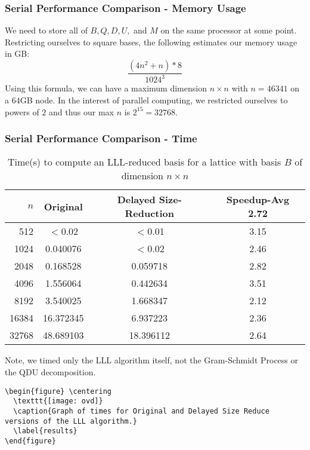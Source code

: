 \documentclass{beamer}
\begin{document}
\begin{frame}
\frametitle{Serial Performance Comparison - Memory Usage}
We need to store all of $B,Q,D,U,$ and $M$ on the same processor at some point. Restricting ourselves to square bases, the following estimates our memory usage in GB:
$$\frac{(4n^2+n)*8}{1024^3}$$
Using this formula, we can have a maximum dimension $n \times n$ with $n=46341$ on a $64$GB node. In the interest of parallel computing, we restricted ourselves to powers of $2$ and thus our max $n$ is $2^{15}=32768$.
\end{frame}
\begin{frame}
\frametitle{Serial Performance Comparison - Time}
\begin{table} \centering
  \caption{Time(s) to compute an LLL-reduced basis for a lattice with basis $B$ of dimension $n\times n$}
  \label{tab:convdemo}
  \vspace{-0.5\baselineskip}
  \begin{tabular}{rccc}
    \hline
    $n$ & Original & Delayed Size-Reduction & Speedup-Avg 2.72\\
    \hline
      512 & $<$0.02   & $<$0.01   & 3.15 \\
     1024 & 0.040076  & $<$0.02   & 2.46 \\
     2048 & 0.168528  & 0.059718  & 2.82 \\
     4096 & 1.556064  & 0.442634  & 3.51 \\
     8192 & 3.540025  & 1.668347  & 2.12 \\
    16384 & 16.372345 & 6.937223  & 2.36 \\
    32768 & 48.689103 & 18.396112 & 2.64 \\
    \hline                          
  \end{tabular}
\end{table}
\tiny{Note, we timed only the LLL algorithm itself, not the Gram-Schmidt Process or the QDU decomposition.}
\end{frame}

\begin{frame}
\begin{verbatim}
\begin{figure} \centering
  \texttt{[image: ovd]}
  \caption{Graph of times for Original and Delayed Size Reduce versions of the LLL algorithm.}
  \label{results}
\end{figure}
\end{verbatim}
\end{frame}
\end{document}
